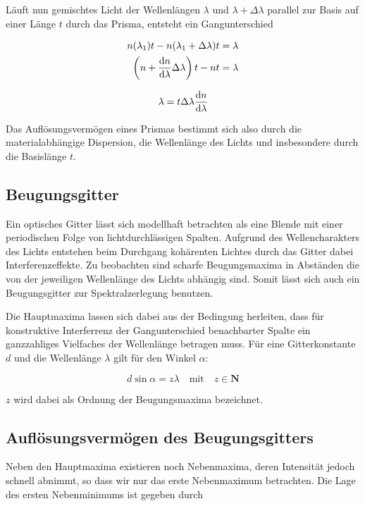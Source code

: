\documentclass[a4paper,german,12pt,smallheadings]{scrartcl}
\begin{document}
Läuft nun gemischtes Licht der Wellenlängen $\lambda$ und $\lambda + \Delta
\lambda$ parallel zur Basis auf einer Länge $t$ durch das Prisma, entsteht ein
Gangunterschied

\begin{align}
  n(\lambda_1) t - n(\lambda_1 + \Delta \lambda) t &= \lambda \\
  \del{ n + \frac{\dif n}{\dif \lambda} \Delta \lambda}t - nt &= \lambda
\end{align}

\begin{equation}
  \lambda = t \Delta \lambda \frac{\dif n}{\dif \lambda}
\end{equation}

Das Auflösungsvermögen eines Prismas bestimmt sich also durch die
materialabhängige Dispersion, die Wellenlänge des Lichts und insbesondere durch
die Basislänge $t$.

\subsection{Beugungsgitter}

Ein optisches Gitter lässt sich modellhaft betrachten als eine Blende mit einer
periodischen Folge von lichtdurchlässigen Spalten. Aufgrund des
Wellencharakters des Lichts entstehen beim Durchgang kohärenten Lichtes durch
das Gitter dabei Interferenzeffekte. Zu beobachten sind scharfe Beugungsmaxima
in Abständen die von der jeweiligen Wellenlänge des Lichts abhängig sind. Somit
lässt sich auch ein Beugungsgitter zur Spektralzerlegung benutzen.

Die Hauptmaxima lassen sich dabei aus der Bedingung herleiten, dass für
konstruktive Interferrenz der Gangunterschied benachbarter Spalte ein
ganzzahliges Vielfaches der Wellenlänge betragen muss. Für eine Gitterkonstante
$d$ und die Wellenlänge $\lambda$ gilt für den Winkel $\alpha$:

\begin{equation}
  d \sin \alpha = z \lambda \quad \text{mit} \quad z \in \mathbf{N}
  \label{eq:1}
\end{equation}

$z$ wird dabei als Ordnung der Beugungsmaxima bezeichnet.

\subsection{Auflösungsvermögen des Beugungsgitters}

Neben den Hauptmaxima existieren noch Nebenmaxima, deren Intensität jedoch
schnell abnimmt, so dass wir nur das erste Nebenmaximum betrachten. Die Lage
des ersten Nebenminimums ist gegeben durch
\end{document}
